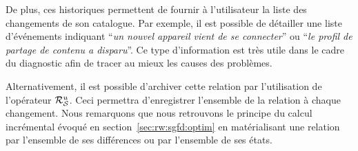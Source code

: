 De plus, ces historiques permettent de fournir à l'utilisateur la liste des changements de son catalogue. Par exemple, il est possible de détailler une liste d'événements indiquant \enquote{\it un nouvel appareil vient de se connecter} ou \enquote{\it le profil de partage de contenu a disparu}. Ce type d'information est très utile dans le cadre du diagnostic afin de tracer au mieux les causes des problèmes.

Alternativement, il est possible d'archiver cette relation par l'utilisation de l'opérateur $\mathcal{R}_{\mathcal S}^{u}$. Ceci permettra d'enregistrer l'ensemble de la relation à chaque changement. Nous remarquons que nous retrouvons le principe du calcul incrémental évoqué en section~\ref{sec:rw:sgfd:optim} en matérialisant une relation par l'ensemble de ses différences ou par l'ensemble de ses états.
